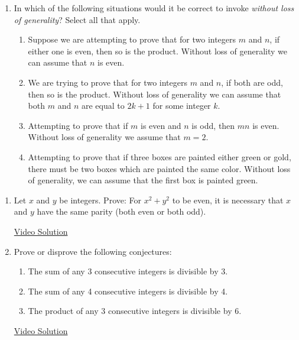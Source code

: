 \begin{enumerate}
	
  \item In which of the following situations would it be correct to invoke \emph{without loss of generality}? Select all that apply.
  \begin{enumerate}
		\item Suppose we are attempting to prove that for two integers $m$ and $n$, if either one is even, then so is the product. Without loss of generality we can assume that $n$ is even.
		\item We are trying to prove that for two integers $m$ and $n$, if both are odd, then so is the product. Without loss of generality we can assume that both $m$ and $n$ are equal to $2k+1$ for some integer $k$.
		\item Attempting to prove that if $m$ is even and $n$ is odd, then $mn$ is even. Without loss of generality we assume that $m=2$.
		\item Attempting to prove that if three boxes are painted either green or gold, there must be two boxes which are painted the same color. Without loss of generality, we can assume that the first box is painted green.
  \end{enumerate}
\end{enumerate}



\begin{enumerate}
  \item Let $x$ and $y$ be integers. Prove: For $x^2+y^2$ to be even, it is necessary that $x$ and $y$ have the same parity (both even or both odd).
  
  \href{https://youtu.be/X3LG7pfEY_c}{Video Solution}
  
  
  \item Prove or disprove the following conjectures:
	\begin{enumerate}
	  \item The sum of any 3 consecutive integers is divisible by 3.
	  \item The sum of any 4 consecutive integers is divisible by 4.
	  \item The product of any 3 consecutive integers is divisible by 6.
	\end{enumerate}
	
  \href{https://youtu.be/R5zpsZoR16w}{Video Solution}
\end{enumerate}
